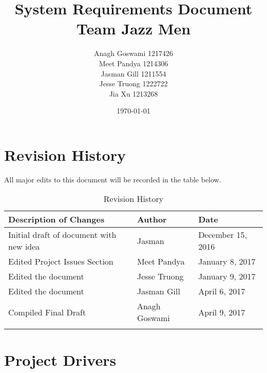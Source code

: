 \documentclass[12pt]{article}
\begin{document}
\title{System Requirements Document\\Team Jazz Men} 
\author{Anagh Goswami 1217426 \\ Meet Pandya 1214306 \\ Jasman Gill  1211554 \\ Jesse Truong  1222722 \\ Jia Xu  1213268 \\}
\date{\today}
\maketitle


\newpage

\tableofcontents
\newpage
{}
\restoregeometry

\section{Revision History}
All major edits to this document will be recorded in the table below.

\begin{table}[h]
\centering
\caption{Revision History}
\begin{tabular}{|l|l|l|}
\Xhline{2\arrayrulewidth}
\bf Description of Changes & \bf Author & \bf Date\\\hline
Initial draft of document with new idea & Jasman & December 15, 2016\\
Edited Project Issues Section & Meet Pandya & January 8, 2017\\
Edited the document & Jesse Truong & January 9, 2017\\
Edited the document & Jasman Gill & April 6, 2017\\
Compiled Final Draft & Anagh Goswami & April 9, 2017\\
\Xhline{2\arrayrulewidth}
\end{tabular}
\end{table}

\newpage
\section{Project Drivers}
\end{document}
